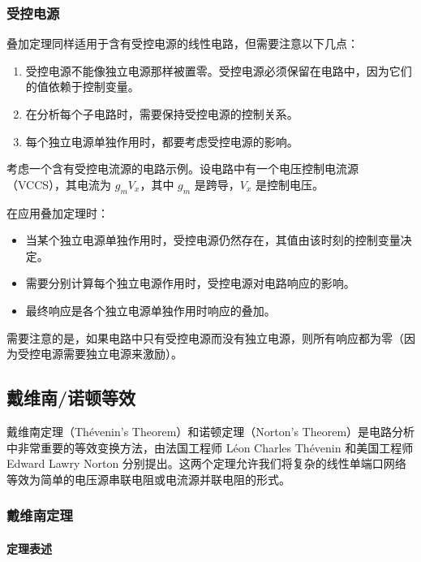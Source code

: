\subsubsection{受控电源}

叠加定理同样适用于含有受控电源的线性电路，但需要注意以下几点：

\begin{enumerate}
  \item 受控电源不能像独立电源那样被置零。受控电源必须保留在电路中，因为它们的值依赖于控制变量。
  \item 在分析每个子电路时，需要保持受控电源的控制关系。
  \item 每个独立电源单独作用时，都要考虑受控电源的影响。
\end{enumerate}

考虑一个含有受控电流源的电路示例。设电路中有一个电压控制电流源（VCCS），其电流为 $g_m V_x$，其中 $g_m$ 是跨导，$V_x$ 是控制电压。

在应用叠加定理时：
\begin{itemize}
  \item 当某个独立电源单独作用时，受控电源仍然存在，其值由该时刻的控制变量决定。
  \item 需要分别计算每个独立电源作用时，受控电源对电路响应的影响。
  \item 最终响应是各个独立电源单独作用时响应的叠加。
\end{itemize}

需要注意的是，如果电路中只有受控电源而没有独立电源，则所有响应都为零（因为受控电源需要独立电源来激励）。

\subsection{戴维南/诺顿等效}

戴维南定理（Thévenin's Theorem）和诺顿定理（Norton's Theorem）是电路分析中非常重要的等效变换方法，由法国工程师 Léon Charles Thévenin 和美国工程师 Edward Lawry Norton 分别提出。这两个定理允许我们将复杂的线性单端口网络等效为简单的电压源串联电阻或电流源并联电阻的形式。

\subsubsection{戴维南定理}

\paragraph{定理表述}


